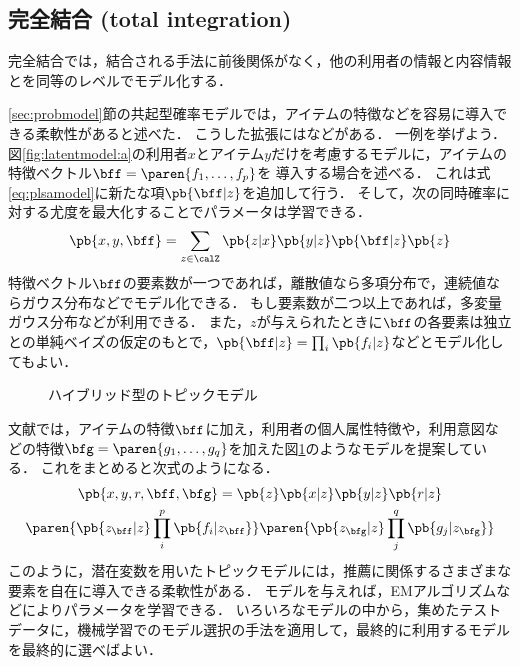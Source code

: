 

\subsection{完全結合 (total integration)}

完全結合では，結合される手法に前後関係がなく，他の利用者の情報と内容情報とを同等のレベルでモデル化する．

\ref{sec:probmodel}節の共起型確率モデルでは，アイテムの特徴などを容易に導入できる柔軟性があると述べた．
こうした拡張には\cite{uai:01:01,ijcai:05:01,trieice:06:04,tripsj:06:02,tieice:07:02}などがある．
一例を挙げよう．
図\ref{fig:latentmodel:a}の利用者$x$とアイテム$y$だけを考慮するモデルに，アイテムの特徴ベクトル$\bff=\paren{f_1,\ldots,f_p}$を
導入する場合を述べる．
これは式\eqref{eq:plsamodel}に新たな項$\pb{\bff|z}$を追加して行う．
そして，次の同時確率に対する尤度を最大化することでパラメータは学習できる．
\[
 \pb{x,y,\bff} = \sum_{z\in\calZ} \pb{z|x} \pb{y|z}\pb{\bff|z}\pb{z}
\]
特徴ベクトル$\bff$の要素数が一つであれば，離散値なら多項分布で，連続値ならガウス分布などでモデル化できる．
もし要素数が二つ以上であれば，多変量ガウス分布などが利用できる．
また，$z$が与えられたときに$\bff$の各要素は独立との単純ベイズの仮定のもとで，$\pb{\bff|z}=\prod_i\pb{f_i|z}$などとモデル化してもよい．

\begin{figure}
\centering
{}
\caption{ハイブリッド型のトピックモデル\cite{trieice:06:04}}
\label{fig:combined-topicmodel}
\end{figure}

文献\cite{trieice:06:04}では，アイテムの特徴$\bff$に加え，利用者の個人属性特徴や，利用意図などの特徴$\bfg=\paren{g_1,\ldots,g_q}$を加えた図\ref{fig:combined-topicmodel}のようなモデルを提案している．
これをまとめると次式のようになる．
\begin{multline*}
\pb{x,y,r,\bff,\bfg} =
 \pb{z}\pb{x|z}\pb{y|z}\pb{r|z}\\
\paren{\pb{z_\bff|z}\prod_i^p\pb{f_i|z_\bff}}
\paren{\pb{z_\bfg|z}\prod_j^q\pb{g_j|z_\bfg}}
\end{multline*}
%
このように，潜在変数を用いたトピックモデルには，推薦に関係するさまざまな要素を自在に導入できる柔軟性がある．
モデルを与えれば，EMアルゴリズムなどによりパラメータを学習できる．
いろいろなモデルの中から，集めたテストデータに，機械学習でのモデル選択の手法を適用して，最終的に利用するモデルを最終的に選べばよい．


